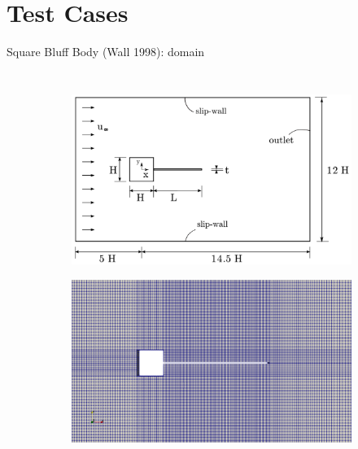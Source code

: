 \documentclass[10pt,t]{beamer}
\begin{document}
\section{Test Cases}

\begin{frame}{Square Bluff Body (Wall 1998): domain}

\begin{columns}
    \begin{figure}[t]
    \vspace*{-1cm}
	\centering
	  \begin{subfigure}[t]{\textwidth}
    \centering
    \includegraphics[width=\linewidth, trim=0 0 0 0, clip]{images/sq-cyl/sq-cyl-domain.png}
  \end{subfigure}
  \hfill
  \begin{subfigure}[t]{\textwidth}
    \includegraphics[width=0.86\linewidth]{images/sq-cyl/sq_mesh.png}
  \end{subfigure}
	
	
	
	
    \end{figure}
    

\end{columns}
\end{frame}
\end{document}
